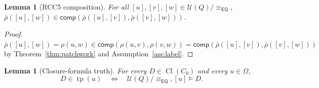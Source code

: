 \documentclass[11pt]{article}
\newtheorem{lemma}[theorem]{Lemma}
\newcommand{\Cl}{\operatorname{Cl}}
\newcommand{\EQ}{\mathsf{EQ}}
\newcommand{\comp}{\mathsf{comp}}
\newcommand{\eqrel}{\equiv_{\EQ}}
\newcommand{\tp}{\operatorname{tp}}
\begin{document}
\begin{lemma}[RCC5 composition]\label{lem:comp-quotient}
For all \([u], [v], [w] \in \mathcal U(Q)/\eqrel\),
\(\bar\rho([u], [w]) \in \comp(\bar\rho([u], [v]), \bar\rho([v], [w]))\).
\end{lemma}

\begin{proof}
\(\bar\rho([u], [w]) = \rho(u, w) \in \comp(\rho(u, v), \rho(v, w))
= \comp(\bar\rho([u], [v]), \bar\rho([v], [w]))\) by
Theorem~\ref{thm:patchwork} and Assumption~\ref{ass:label}.
\end{proof}

\begin{lemma}[Closure-formula truth]\label{lem:truth}
For every \(D \in \Cl(C_0)\) and every \(u \in \Omega\),
\[
  D \in \tp(u)
  \quad\Longleftrightarrow\quad
  \mathcal U(Q)/\eqrel, [u] \models D.
\]
\end{lemma}
\end{document}
